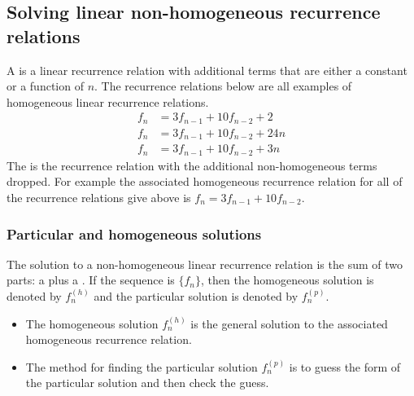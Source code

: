 \subsection{Solving linear non-homogeneous recurrence relations}
A  is a linear recurrence relation with additional terms that are either a constant or a function of $n$. The recurrence relations below are all examples of homogeneous linear recurrence relations.
\begin{align*}
  f_n & = 3f_{n-1} + 10f_{n-2} + 2   \\
  f_n & = 3f_{n-1} + 10f_{n-2} + 24n \\
  f_n & = 3f_{n-1} + 10f_{n-2} + 3n
\end{align*}
The  is the recurrence relation with the additional non-homogeneous terms dropped. For example the associated homogeneous recurrence relation for all of the recurrence relations give above is $f_n = 3f_{n-1} + 10f_{n-2}$.

\subsubsection*{Particular and homogeneous solutions}
The solution to a non-homogeneous linear recurrence relation is the sum of two parts: a  plus a . If the sequence is $\{f_n\}$, then the homogeneous solution is denoted by $f_n^{(h)}$ and the particular solution is denoted by $f_n^{(p)}$.
\begin{itemize}
  \item The homogeneous solution $f_n^{(h)}$ is the general solution to the associated homogeneous recurrence relation.
  \item The method for finding the particular solution $f_n^{(p)}$ is to guess the form of the particular solution and then check the guess.
\end{itemize}

